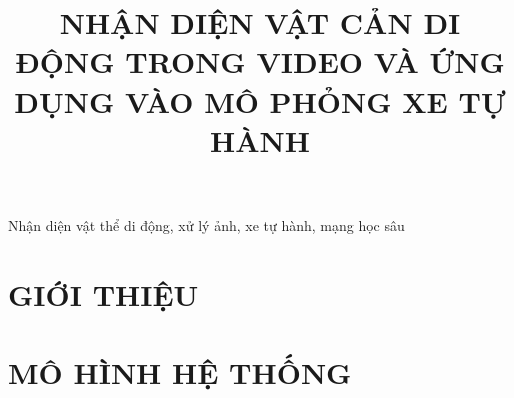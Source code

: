 \documentclass[10pt,conference,a4paper]{IEEEtran}
\begin{document}
\columnsep=0.63cm
\def\mathbi#1{\boldsymbol{#1}}
\def\erfc{\:\mathrm{erfc}}
\def\arg{\:\mathrm{arg}}
\def\E{\:\mathrm{E}}
\def\sinc{\:\mathrm{sinc}}
\def\T{\mathrm{T}}
\def\H{\mathrm{H}}
\newcommand{\bigsize}{\fontsize{16pt}{20pt}\selectfont}

%

\title{NHẬN DIỆN VẬT CẢN DI ĐỘNG TRONG VIDEO VÀ ỨNG DỤNG VÀO MÔ PHỎNG XE TỰ HÀNH}

\author{
}
\maketitle

\begin{abstract}




\end{abstract}

\begin{IEEEkeywords}
Nhận diện vật thể di động, xử lý ảnh, xe tự hành, mạng học sâu
\end{IEEEkeywords}
\IEEEpeerreviewmaketitle
%
\section{GIỚI THIỆU}






%
\section{MÔ HÌNH HỆ THỐNG}
\label{Sec:MoHinhHeThong}
\end{document}
